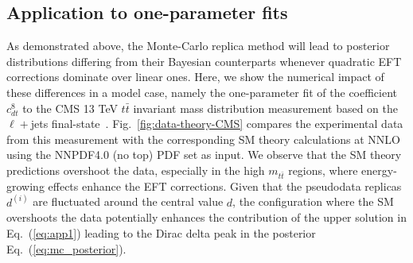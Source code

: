 \documentclass[withindex,glossary]{cam-thesis}
\newcommand{\simunet}{\textsc{SIMUnet}}
\newcommand{\smefit}{\textsc{SMEFiT}}
\begin{document}

\subsection{Application to one-parameter fits}
\label{subsec:mc_examples}

As demonstrated above, the Monte-Carlo replica method will lead to
posterior distributions differing from their Bayesian counterparts whenever quadratic
EFT corrections dominate over linear ones.
%
Here, we show the numerical impact of these differences in a model case, namely
the one-parameter fit of the coefficient $c_{dt}^8$ to
the CMS 13 TeV $t\bar{t}$ invariant mass distribution measurement
based on the $\ell+$jets final-state~\cite{CMS:2021vhb}.
%
Fig.~\ref{fig:data-theory-CMS} compares the experimental data
from this measurement with the corresponding
SM theory calculations at NNLO using the NNPDF4.0 (no top) PDF
set as input.
%
We observe that the SM theory predictions overshoot the data, especially in the high $m_{t\bar{t}}$
regions, where energy-growing effects enhance the EFT corrections.
%
Given that the pseudodata replicas $d^{(i)}$ are fluctuated around the central value $d$,
the configuration where the SM overshoots the data
potentially enhances the contribution of the upper solution in Eq.~(\ref{eq:app1})
leading to the Dirac delta peak in the posterior Eq.~(\ref{eq:mc_posterior}).     
\end{document}
